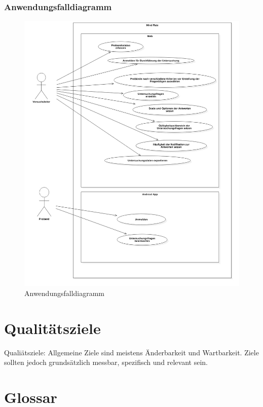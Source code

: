 \documentclass[a4paper]{scrreprt}
\begin{document}
            \subsection{Anwendungsfalldiagramm}
                \vspace{0.4cm}
                \begin{figure}
                    \centering
                    \includegraphics[scale = 0.4]{UseCaseDiagram1.jpg}
                    \caption{Anwendungsfalldiagramm}
                \end{figure}

        \newpage

    \chapter{Qualitätsziele}
        Qualiätsziele: Allgemeine Ziele sind meistens Änderbarkeit und Wartbarkeit.
        Ziele sollten jedoch grundsätzlich messbar, spezifisch und relevant sein.

    \chapter{Glossar}

    \listoffigures
\end{document}
